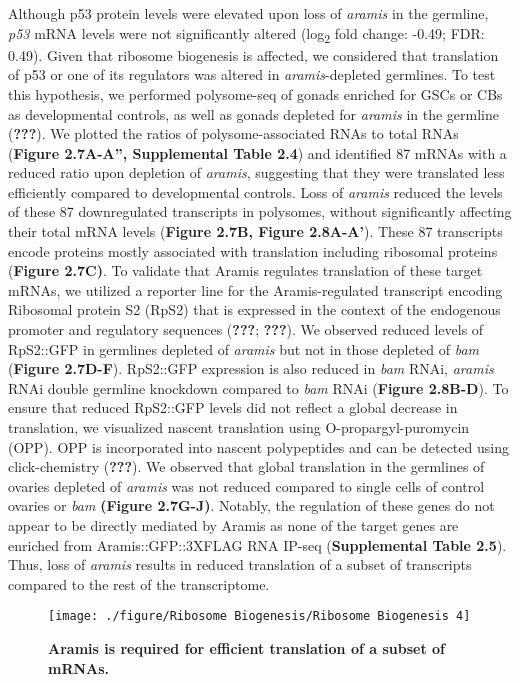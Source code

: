 \documentclass[12pt,oneside]{reedthesis}
\begin{document}
Although p53 protein levels were elevated upon loss of \emph{aramis} in the germline, \emph{p53} mRNA levels were not significantly altered (log\textsubscript{2} fold change: -0.49; FDR: 0.49). Given that ribosome biogenesis is affected, we considered that translation of p53 or one of its regulators was altered in \emph{aramis}-depleted germlines. To test this hypothesis, we performed polysome-seq of gonads enriched for GSCs or CBs as developmental controls, as well as gonads depleted for \emph{aramis} in the germline ({\textbf{???}}). We plotted the ratios of polysome-associated RNAs to total RNAs (\textbf{Figure 2.7A-A'', Supplemental Table 2.4}) and identified 87 mRNAs with a reduced ratio upon depletion of \emph{aramis}, suggesting that they were translated less efficiently compared to developmental controls. Loss of \emph{aramis} reduced the levels of these 87 downregulated transcripts in polysomes, without significantly affecting their total mRNA levels (\textbf{Figure 2.7B, Figure 2.8A-A'}). These 87 transcripts encode proteins mostly associated with translation including ribosomal proteins (\textbf{Figure 2.7C)}. To validate that Aramis regulates translation of these target mRNAs, we utilized a reporter line for the Aramis-regulated transcript encoding Ribosomal protein S2 (RpS2) that is expressed in the context of the endogenous promoter and regulatory sequences ({\textbf{???}}; {\textbf{???}}). We observed reduced levels of RpS2::GFP in germlines depleted of \emph{aramis} but not in those depleted of \emph{bam} (\textbf{Figure 2.7D-F}). RpS2::GFP expression is also reduced in \emph{bam} RNAi, \emph{aramis} RNAi double germline knockdown compared to \emph{bam} RNAi (\textbf{Figure 2.8B-D}). To ensure that reduced RpS2::GFP levels did not reflect a global decrease in translation, we visualized nascent translation using O-propargyl-puromycin (OPP). OPP is incorporated into nascent polypeptides and can be detected using click-chemistry ({\textbf{???}}). We observed that global translation in the germlines of ovaries depleted of \emph{aramis} was not reduced compared to single cells of control ovaries or \emph{bam} \textbf{(Figure 2.7G-J)}. Notably, the regulation of these genes do not appear to be directly mediated by Aramis as none of the target genes are enriched from Aramis::GFP::3XFLAG RNA IP-seq (\textbf{Supplemental Table 2.5}). Thus, loss of \emph{aramis} results in reduced translation of a subset of transcripts compared to the rest of the transcriptome.
\begin{figure}

{\centering \texttt{[image: ./figure/Ribosome Biogenesis/Ribosome Biogenesis 4]} 

}

\caption[\textbf{Aramis is required for efficient translation of a subset of mRNAs.}]{\textbf{Aramis is required for efficient translation of a subset of mRNAs.}}\label{fig:unnamed-chunk-12}
\end{figure}
\end{document}
